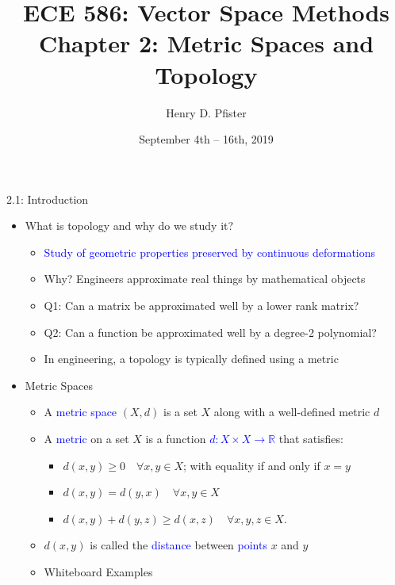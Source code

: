 \documentclass[10pt,english]{beamer}
\newif\ifslow
\begin{document}
\ifslow

\title{ECE 586: Vector Space Methods \\ Chapter 2: Metric Spaces and Topology}
\author{Henry D. Pfister \\ \univ}
\date{September 4th -- 16th, 2019}
\maketitle

\begin{frame}{2.1: Introduction}

\begin{itemize}
\setlength\itemsep{3mm}
\item<1-> What is topology and why do we study it? \vspace{1mm}
\begin{itemize} 
  \setlength\itemsep{1.5mm}
  \item<1-> \textcolor{blue}{Study of geometric properties preserved by continuous deformations}
  \item<2-> Why? Engineers approximate real things by mathematical objects
  \item<2-> Q1: Can a matrix be approximated well by a lower rank matrix?
  \item<2-> Q2: Can a function be approximated well by a degree-2 polynomial?
  \item<2-> In engineering, a topology is typically defined using a metric
\end{itemize}

\vspace{1mm}

\item<3-> Metric Spaces \vspace{1mm}
\begin{itemize} 
  \setlength\itemsep{1.5mm}
  \item A \textcolor{blue}{metric space} $(X,d)$ is a set $X$ along with a well-defined metric $d$
  \item A \textcolor{blue}{metric} on a set $X$ is a function \textcolor{blue}{$d \colon X \times X \rightarrow \mathbb{R} $} that satisfies: \vspace{1mm}
  \begin{itemize}
  \setlength\itemsep{1.5mm}
  \item $d(x,y) \geq 0 \quad \forall x, y \in X$; with equality if and only if $x = y$
  \item $d(x,y) = d(y,x) \quad \forall x, y \in X$
  \item $d(x,y) + d(y,z) \geq d(x,z) \quad \forall x, y, z \in X$.
  \end{itemize}
  \item $d(x,y)$ is called the \textcolor{blue}{distance} between \textcolor{blue}{points} $x$ and $y$
  \item Whiteboard Examples
\end{itemize}
\end{itemize}
\end{frame}
\end{document}

